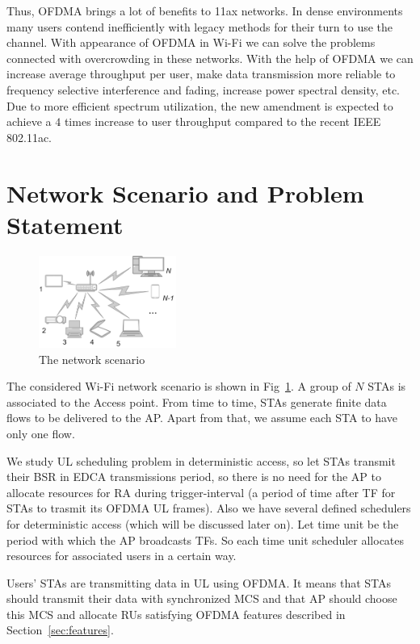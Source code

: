 Thus, OFDMA brings a lot of benefits to 11ax networks. In dense environments many users contend inefficiently with legacy methods for their turn to use the channel. 
With appearance of OFDMA in Wi-Fi we can solve the problems connected with overcrowding in these networks.
With the help of OFDMA we can increase average throughput per user, make data transmission more reliable to frequency selective interference and fading, increase power spectral density, etc. Due to more efficient spectrum utilization, the new amendment is expected to achieve a $4$ times increase to user throughput compared to the recent IEEE 802.11ac.

\section{Network Scenario and Problem Statement}
\label{sec:scenario}

\begin{figure}[t]
	\includegraphics[width = 0.4\textwidth]{NetworkScenario}
	\caption{\label{fig:scenario} The network scenario}
\end{figure}

The considered Wi-Fi network scenario is shown in Fig~\ref{fig:scenario}. A group of $N$ STAs is associated to the Access point. 
From time to time, STAs generate finite data flows to be delivered to the AP. Apart from that, we assume each STA to have only one flow.

We study UL scheduling problem in deterministic access, so let STAs transmit their BSR in EDCA transmissions period, so there is no need for the AP to allocate resources for RA during trigger-interval (a period of time after TF for STAs to trasmit its OFDMA UL frames).
Also we have several defined schedulers for deterministic access (which will be discussed later on). 
Let time unit be the period with which the AP broadcasts TFs.
So each time unit scheduler allocates resources for associated users in a certain way.

Users' STAs are transmitting data in UL using OFDMA. 
It means that STAs should transmit their data with synchronized MCS and that AP should choose this MCS and allocate RUs satisfying OFDMA features described in Section~\ref{sec:features}. 

